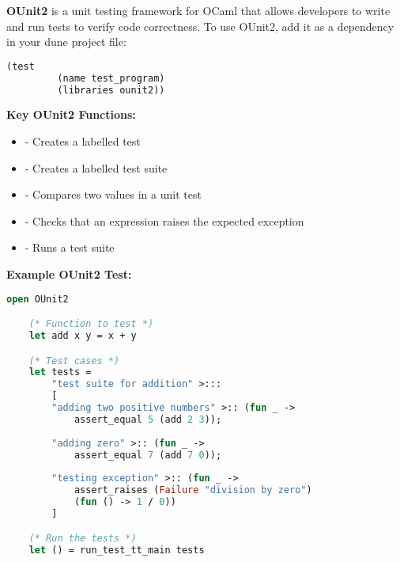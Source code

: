     \vspace{-0em}
    \begin{Def}

        \textbf{OUnit2} is a unit testing framework for OCaml that allows developers to write and run tests to verify code correctness.
        To use OUnit2, add it as a dependency in your dune project file:
        \begin{lstlisting}[language=OCaml, numbers=none]
        (test
         (name test_program)
         (libraries ounit2))
        \end{lstlisting}

        \noindent
        \textbf{Key OUnit2 Functions:}
        \begin{itemize}
            \item \snippet{(>::)} - Creates a labelled test
            \item \snippet{(>:::)} - Creates a labelled test suite
            \item {} - Compares two values in a unit test
            \item {} - Checks that an expression raises the expected exception
            \item {} - Runs a test suite
        \end{itemize}

        \noindent
        \textbf{Example OUnit2 Test:}
        \begin{lstlisting}[language=OCaml, numbers=none]
    open OUnit2

    (* Function to test *)
    let add x y = x + y

    (* Test cases *)
    let tests = 
        "test suite for addition" >:::
        [
        "adding two positive numbers" >:: (fun _ -> 
            assert_equal 5 (add 2 3));
        
        "adding zero" >:: (fun _ -> 
            assert_equal 7 (add 7 0));
            
        "testing exception" >:: (fun _ ->
            assert_raises (Failure "division by zero") 
            (fun () -> 1 / 0))
        ]

    (* Run the tests *)
    let () = run_test_tt_main tests
        \end{lstlisting}
    \end{Def}